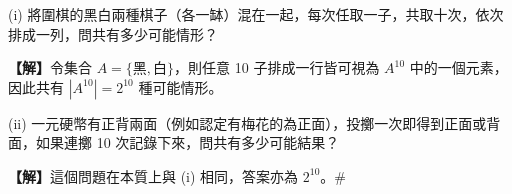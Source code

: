 \vspace{1em}
\begin{example}\label{ex:b5-2-8}
(i) 將圍棋的黑白兩種棋子（各一缽）混在一起，每次任取一子，共取十次，依次排成一列，問共有多少可能情形？
\par\smallskip\noindent\textbf{【解】}\quad 令集合 $A = \{\text{黑}, \text{白}\}$，則任意 10 子排成一行皆可視為 $A^{10}$ 中的一個元素，因此共有 $|A^{10}| = 2^{10}$ 種可能情形。

\indent(ii) 一元硬幣有正背兩面（例如認定有梅花的為正面），投擲一次即得到正面或背面，如果連擲 10 次記錄下來，問共有多少可能結果？
\par\smallskip\noindent\textbf{【解】}\quad 這個問題在本質上與 (i) 相同，答案亦為 $2^{10}$。\hfill\#
\end{example}

\vspace{1em}
